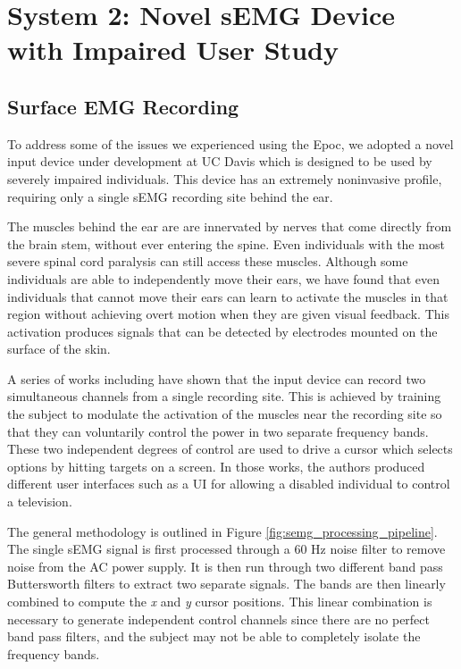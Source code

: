 \section{System 2: Novel sEMG Device with Impaired User Study}
\setcounter{subsection}{0}
\subsection{Surface EMG Recording}
\label{sec:semg_hardware}
 To address some of the issues we experienced using the Epoc, we adopted a novel input device under development at UC Davis which is designed to be used by severely impaired individuals. This device has an extremely noninvasive profile, requiring only a single sEMG recording site behind the ear. 

The muscles behind the ear are are innervated by nerves that come directly from the brain stem, without ever entering the spine. Even individuals with the most severe spinal cord paralysis can still access these muscles. Although some individuals are able to independently move their ears, we have found that even individuals that cannot move their ears can learn to activate the muscles in that region without achieving overt motion when they are given visual feedback. This activation produces signals that can be detected by electrodes mounted on the surface of the skin. 

A series of works including \cite{joshisensor,JoshiTwoDimCursor,JoshiEPLPilot} have shown that the input device can record two simultaneous channels from a single recording site. This is achieved by training the subject to modulate the activation of the muscles near the recording site so that they can voluntarily control the power in two separate frequency bands. These two independent degrees of control are used to drive a cursor which selects options by hitting targets on a screen. In those works, the authors produced different user interfaces such as a UI for allowing a disabled individual to control a television. 

The general methodology is outlined in Figure \ref{fig:semg_processing_pipeline}. The single sEMG signal is first processed through a 60 Hz noise filter to remove noise from the AC power supply. It is then run through two different band pass Buttersworth filters to extract two separate signals. The bands are then linearly combined to compute the \emph{x} and \emph{y} cursor positions. This linear combination is necessary to generate independent control channels since there are no perfect band pass filters, and the subject may not be able to completely isolate the frequency bands. 


